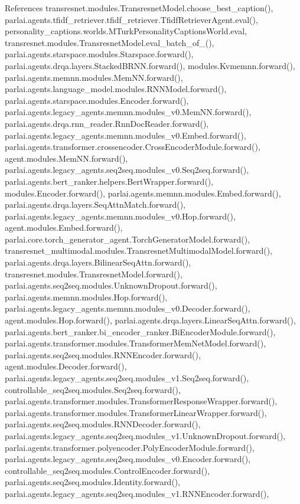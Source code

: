 References transresnet.\+modules.\+Transresnet\+Model.\+choose\+\_\+best\+\_\+caption(), parlai.\+agents.\+tfidf\+\_\+retriever.\+tfidf\+\_\+retriever.\+Tfidf\+Retriever\+Agent.\+eval(), personality\+\_\+captions.\+worlds.\+M\+Turk\+Personality\+Captions\+World.\+eval, transresnet.\+modules.\+Transresnet\+Model.\+eval\+\_\+batch\+\_\+of\+\_(), parlai.\+agents.\+starspace.\+modules.\+Starspace.\+forward(), parlai.\+agents.\+drqa.\+layers.\+Stacked\+B\+R\+N\+N.\+forward(), modules.\+Kvmemnn.\+forward(), parlai.\+agents.\+memnn.\+modules.\+Mem\+N\+N.\+forward(), parlai.\+agents.\+language\+\_\+model.\+modules.\+R\+N\+N\+Model.\+forward(), parlai.\+agents.\+starspace.\+modules.\+Encoder.\+forward(), parlai.\+agents.\+legacy\+\_\+agents.\+memnn.\+modules\+\_\+v0.\+Mem\+N\+N.\+forward(), parlai.\+agents.\+drqa.\+rnn\+\_\+reader.\+Rnn\+Doc\+Reader.\+forward(), parlai.\+agents.\+legacy\+\_\+agents.\+memnn.\+modules\+\_\+v0.\+Embed.\+forward(), parlai.\+agents.\+transformer.\+crossencoder.\+Cross\+Encoder\+Module.\+forward(), agent.\+modules.\+Mem\+N\+N.\+forward(), parlai.\+agents.\+legacy\+\_\+agents.\+seq2seq.\+modules\+\_\+v0.\+Seq2seq.\+forward(), parlai.\+agents.\+bert\+\_\+ranker.\+helpers.\+Bert\+Wrapper.\+forward(), modules.\+Encoder.\+forward(), parlai.\+agents.\+memnn.\+modules.\+Embed.\+forward(), parlai.\+agents.\+drqa.\+layers.\+Seq\+Attn\+Match.\+forward(), parlai.\+agents.\+legacy\+\_\+agents.\+memnn.\+modules\+\_\+v0.\+Hop.\+forward(), agent.\+modules.\+Embed.\+forward(), parlai.\+core.\+torch\+\_\+generator\+\_\+agent.\+Torch\+Generator\+Model.\+forward(), transresnet\+\_\+multimodal.\+modules.\+Transresnet\+Multimodal\+Model.\+forward(), parlai.\+agents.\+drqa.\+layers.\+Bilinear\+Seq\+Attn.\+forward(), transresnet.\+modules.\+Transresnet\+Model.\+forward(), parlai.\+agents.\+seq2seq.\+modules.\+Unknown\+Dropout.\+forward(), parlai.\+agents.\+memnn.\+modules.\+Hop.\+forward(), parlai.\+agents.\+legacy\+\_\+agents.\+memnn.\+modules\+\_\+v0.\+Decoder.\+forward(), agent.\+modules.\+Hop.\+forward(), parlai.\+agents.\+drqa.\+layers.\+Linear\+Seq\+Attn.\+forward(), parlai.\+agents.\+bert\+\_\+ranker.\+bi\+\_\+encoder\+\_\+ranker.\+Bi\+Encoder\+Module.\+forward(), parlai.\+agents.\+transformer.\+modules.\+Transformer\+Mem\+Net\+Model.\+forward(), parlai.\+agents.\+seq2seq.\+modules.\+R\+N\+N\+Encoder.\+forward(), agent.\+modules.\+Decoder.\+forward(), parlai.\+agents.\+legacy\+\_\+agents.\+seq2seq.\+modules\+\_\+v1.\+Seq2seq.\+forward(), controllable\+\_\+seq2seq.\+modules.\+Seq2seq.\+forward(), parlai.\+agents.\+transformer.\+modules.\+Transformer\+Response\+Wrapper.\+forward(), parlai.\+agents.\+transformer.\+modules.\+Transformer\+Linear\+Wrapper.\+forward(), parlai.\+agents.\+seq2seq.\+modules.\+R\+N\+N\+Decoder.\+forward(), parlai.\+agents.\+legacy\+\_\+agents.\+seq2seq.\+modules\+\_\+v1.\+Unknown\+Dropout.\+forward(), parlai.\+agents.\+transformer.\+polyencoder.\+Poly\+Encoder\+Module.\+forward(), parlai.\+agents.\+legacy\+\_\+agents.\+seq2seq.\+modules\+\_\+v0.\+Encoder.\+forward(), controllable\+\_\+seq2seq.\+modules.\+Control\+Encoder.\+forward(), parlai.\+agents.\+seq2seq.\+modules.\+Identity.\+forward(), parlai.\+agents.\+legacy\+\_\+agents.\+seq2seq.\+modules\+\_\+v1.\+R\+N\+N\+Encoder.\+forward(), 